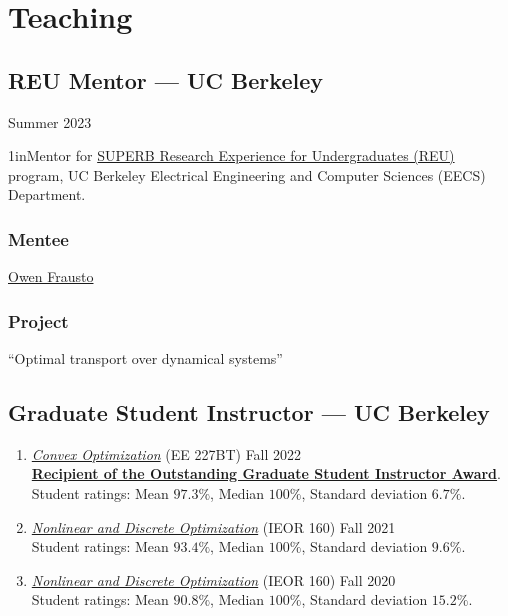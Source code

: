 \documentclass[11pt]{article}
\newcommand{\sectionwidth}{1in}		%
\newcommand{\subsectionskip}{\baselineskip}	%
\newcommand{\cvdate}[1]{\hfill#1}			%
\begin{document}
	\section{Teaching}

	\subsection{REU Mentor --- UC Berkeley}
	\cvdate{Summer 2023}
	
	\begin{adjustwidth}{\sectionwidth}{}Mentor for \href{https://eecs.berkeley.edu/resources/undergrads/research/superb}{SUPERB Research Experience for Undergraduates (REU)} program, UC Berkeley Electrical Engineering and Computer Sciences (EECS) Department.\end{adjustwidth}

	\subsubsection{Mentee}
	\href{https://www.linkedin.com/in/owen-frausto-39786a217}{Owen Frausto}
	
	\subsubsection{Project}
	``Optimal transport over dynamical systems''
	
	\vspace*{\subsectionskip}
	
	\subsection{Graduate Student Instructor --- UC Berkeley}
	\begin{enumerate}[label={\arabic*.}]
		\item \href{https://classes.berkeley.edu/content/2022-fall-eleng-227bt-001-lec-001}{\textit{Convex Optimization}} (EE 227BT) \cvdate{Fall 2022} \\
		\textbf{\href{https://gsi.berkeley.edu/programs-services/award-programs/ogsi/ogsi-recipients-2022-2023/}{Recipient of the Outstanding Graduate Student Instructor Award}}. \\
		Student ratings: Mean $97.3\%$, Median $100\%$, Standard deviation $6.7\%$.
		\item \href{https://lavaei.ieor.berkeley.edu/Course_IEOR160_Fall_2021.html}{\textit{Nonlinear and Discrete Optimization}} (IEOR 160) \cvdate{Fall 2021} \\
		Student ratings: Mean $93.4\%$, Median $100\%$, Standard deviation $9.6\%$.
		\item \href{https://lavaei.ieor.berkeley.edu/Course_IEOR160_Fall_2020.html}{\textit{Nonlinear and Discrete Optimization}} (IEOR 160) \cvdate{Fall 2020} \\
		Student ratings: Mean $90.8\%$, Median $100\%$, Standard deviation $15.2\%$.
	\end{enumerate}
	
\end{document}
